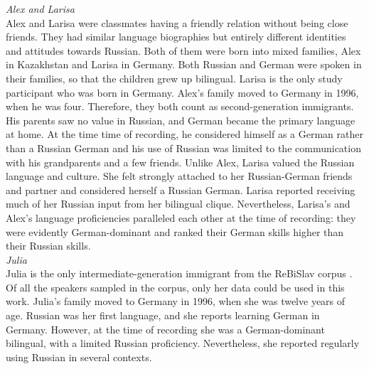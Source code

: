 \noindent \textit{Alex and Larisa}\\
Alex and Larisa were classmates having a friendly relation without being close friends. They had similar language biographies but entirely different identities and attitudes towards Russian. Both of them were born into mixed families, Alex in Kazakhstan and Larisa in Germany. Both Russian and German were spoken in their families, so that the children grew up bilingual. Larisa is the only study participant who was born in Germany. Alex's family moved to Germany in 1996, when he was four. Therefore, they both count as second-generation immigrants. His parents saw no value in Russian, and German became the primary language at home. At the time time of recording, he considered himself as a German rather than a Russian German and his use of Russian was limited to the communication with his grandparents and a few friends. Unlike Alex, Larisa valued the Russian language and culture. She felt strongly attached to her Russian-German friends and partner and considered herself a Russian German. Larisa reported receiving much of her Russian input from her bilingual clique. Nevertheless, Larisa's and Alex's language proficiencies paralleled each other at the time of recording: they were evidently German-dominant and ranked their German skills higher than their Russian skills.\\

\noindent \textit{Julia}\\
Julia is the only intermediate-generation immigrant from the ReBiSlav corpus \citep{rebislav}. Of all the speakers sampled in the corpus, only her data could be used in this work. Julia's family moved to Germany in 1996, when she was twelve years of age. Russian was her first language, and she reports learning German in Germany. However, at the time of recording she was a German-dominant bilingual, with a limited Russian proficiency. Nevertheless, she reported regularly using Russian in several contexts.\\

